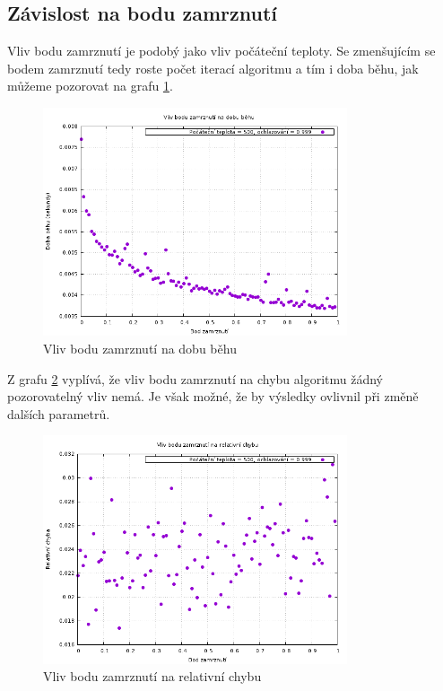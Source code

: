 \documentclass[11pt]{article}
\begin{document}
\subsection{Závislost na bodu zamrznutí}

Vliv bodu zamrznutí je podobý jako vliv počáteční teploty. Se zmenšujícím se bodem zamrznutí tedy roste počet iterací algoritmu a tím i doba běhu, jak můžeme pozorovat na grafu \ref{fig:frozen}.

\begin{figure}[h!]
	\centering
    	\includegraphics[width=0.8\textwidth]{../grafy/frozen.png}
	\caption{Vliv bodu zamrznutí na dobu běhu}
	\label{fig:frozen}
\end{figure}

Z grafu \ref{fig:frozen_e} vyplívá, že vliv bodu zamrznutí na chybu algoritmu žádný pozorovatelný vliv nemá. Je však možné, že by výsledky ovlivnil při změně dalších parametrů. 

\begin{figure}[h!]
	\centering
    	\includegraphics[width=0.8\textwidth]{../grafy/frozen_e.png}
	\caption{Vliv bodu zamrznutí na relativní chybu}
	\label{fig:frozen_e}
\end{figure}
\end{document}
